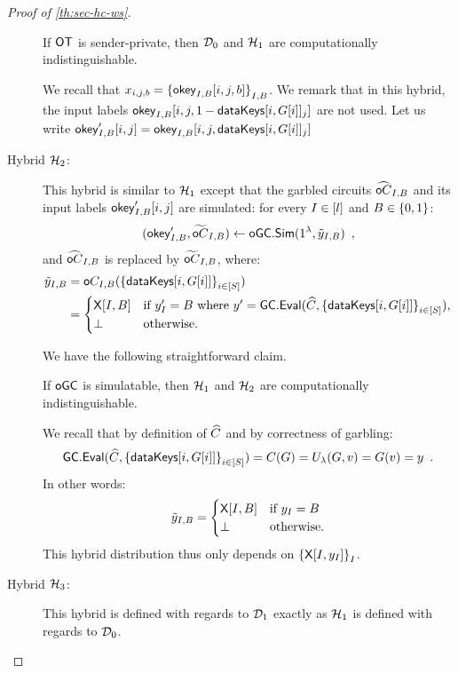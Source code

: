 \begin{proof}[Proof of \cref{th:sec-hc-ws}]
\begin{description}
    \begin{claim}
      If $\mathsf{OT}$ is sender-private, then $\mathcal{D}_0$ and $\mathcal{H}_1$ are computationally indistinguishable.
    \end{claim}

    We recall that $x_{i,j,b} = {\{{\mathsf{okey}}_{I,B}[i,j,b]\}}_{I,B}$.
    We remark that in this hybrid, the input labels ${\mathsf{okey}}_{I,B}[i,j,1-\mathsf{dataKeys}[i,G[i]]_j]$ are not used. Let us write ${\mathsf{okey}}'_{I,B}[i,j] = {\mathsf{okey}}_{I,B}[i,j,\mathsf{dataKeys}[i,G[i]]_j]$
  \item[Hybrid $\mathcal{H}_2$:] This hybrid is similar to $\mathcal{H}_1$ except that the garbled circuits $\widehat{\mathsf{o}C}_{I,B}$ and its input labels ${\mathsf{okey}}'_{I,B}[i,j]$ are simulated: for every $I \in [l]$ and $B \in {\{0,1\}}$:
    \[ ({\mathsf{okey}}'_{I,B}, \widetilde{\mathsf{o}C}_{I,B}) \gets {\mathsf{oGC.Sim}}(1^\lambda,\tilde{y}_{I,B})\enspace, \]
    and $\widehat{\mathsf{o}C}_{I,B}$ is replaced by $\widetilde{\mathsf{o}C}_{I,B}$,
    where:
    \begin{align*}
    \tilde{y}_{I,B} &= \mathsf{o}C_{I,B}({\{\mathsf{dataKeys}[i,G[i]]\}}_{i \in [S]}) \\
      &=
      \begin{cases}
        \mathsf{X}[I,B] &\text{if } y'_I = B \text{ where } y' = \mathsf{GC.Eval}(\widehat{C},{\{\mathsf{dataKeys}[i,G[i]]\}}_{i \in [S]}), \\
        \perp &\text{otherwise.}
      \end{cases}
    \end{align*}
    
    We have the following straightforward claim.
    \begin{claim}
      If ${\mathsf{oGC}}$ is simulatable, then $\mathcal{H}_1$ and $\mathcal{H}_2$ are computationally indistinguishable.
    \end{claim}

    We recall that by definition of $\widehat{C}$ and by correctness of garbling:
    \[ \mathsf{GC.Eval}(\widehat{C},{\{\mathsf{dataKeys}[i,G[i]]\}}_{i \in [S]}) = C(G) = U_\lambda(G,v) = G(v) = y \enspace. \]
    In other words:
    \[ \tilde{y}_{I,B}       =
      \begin{cases}
        \mathsf{X}[I,B] &\text{if } y_I = B \\
        \perp &\text{otherwise.}
      \end{cases}
    \]
    This hybrid distribution thus only depends on ${\{\mathsf{X}[I,y_I]\}}_I$.
  \item[Hybrid $\mathcal{H}_3$:] This hybrid is defined with regards to $\mathcal{D}_1$ exactly as $\mathcal{H}_1$ is defined with regards to $\mathcal{D}_0$.


\end{description}
\end{proof}
